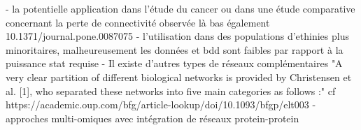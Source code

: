 - la potentielle application dans l'étude du cancer ou dans une étude comparative concernant la perte de connectivité observée là bas également 10.1371/journal.pone.0087075
- l'utilisation dans des populations d'ethinies plus minoritaires, malheureusement les données et bdd sont faibles par rapport à la puissance stat requise
- Il existe d'autres types de réseaux complémentaires "A very clear partition of different biological networks is provided by Christensen et al. [1], who separated these networks into five main categories as follows :" cf https://academic.oup.com/bfg/article-lookup/doi/10.1093/bfgp/elt003
- approches multi-omiques avec intégration de réseaux protein-protein %